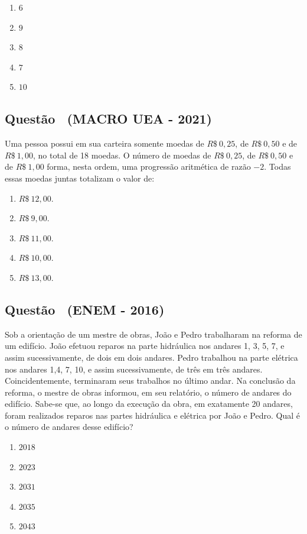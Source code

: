 \documentclass[12pt]{article}
\newcounter{questao}
\newcommand{\novaquestao}[1]{%
  \stepcounter{questao}%
  \subsection*{Questão \thequestao\ (#1)}%
}
\begin{document}
\begin{multicols}{2}
        
            \begin{enumerate}[label=(\alph*), noitemsep]
                \item $6$
                \item $9$
                \item $8$
                \item $7$
                \item $10$
            \end{enumerate}
        
        \novaquestao{MACRO UEA - 2021}
            Uma pessoa possui em sua carteira somente moedas de $R\$\ 0,25$, de $R\$\ 0,50$ e de $R\$\ 1,00$, no total de 18 moedas. O número de moedas de $R\$\ 0,25$, de $R\$\ 0,50$ e de $R\$\ 1,00$ forma, nesta ordem, uma progressão aritmética de razão $-2$. Todas essas moedas juntas totalizam o valor de:
            
            \begin{enumerate}[label=(\alph*), noitemsep]
                \item $R\$ \ 12,00.$
                \item $R\$ \ 9,00.$
                \item $R\$ \ 11,00.$
                \item $R\$ \ 10,00.$
                \item $R\$ \ 13,00.$
            \end{enumerate}
        
        \novaquestao{ENEM - 2016}
        
            Sob a orientação de um mestre de obras, João e Pedro trabalharam na reforma de um edifício. João efetuou reparos na parte hidráulica nos andares 1, 3, 5, 7, e assim sucessivamente, de dois em dois andares. Pedro trabalhou na parte elétrica nos andares 1,4, 7, 10, e assim sucessivamente, de três em três andares. Coincidentemente, terminaram seus trabalhos no último andar. Na conclusão da reforma, o mestre de obras informou, em seu relatório, o número de andares do edifício. 
            Sabe-se que, ao longo da execução da obra, em exatamente 20 andares, foram realizados reparos nas partes hidráulica e elétrica por João e Pedro.  Qual é o número de andares desse edifício?
        
            \begin{enumerate}[label=(\alph*), noitemsep]
                \item $2018$
                \item $2023$
                \item $2031$
                \item $2035$
                \item $2043$
            \end{enumerate}
        

\end{multicols}
\end{document}
